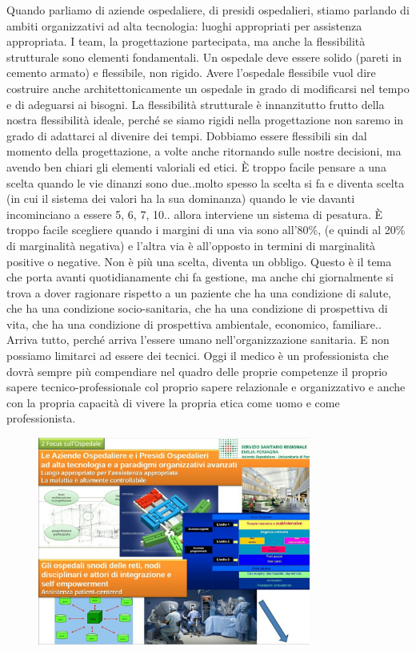 Quando parliamo di aziende ospedaliere, di presidi ospedalieri, stiamo
parlando di ambiti organizzativi ad alta tecnologia: luoghi appropriati
per assistenza appropriata. I team, la progettazione partecipata, ma
anche la flessibilità strutturale sono elementi fondamentali. Un
ospedale deve essere solido (pareti in cemento armato) e flessibile, non
rigido. Avere l'ospedale flessibile vuol dire costruire anche
architettonicamente un ospedale in grado di modificarsi nel tempo e di
adeguarsi ai bisogni. La flessibilità strutturale è innanzitutto frutto
della nostra flessibilità ideale, perché se siamo rigidi nella
progettazione non saremo in grado di adattarci al divenire dei tempi.
Dobbiamo essere flessibili sin dal momento della progettazione, a volte
anche ritornando sulle nostre decisioni, ma avendo ben chiari gli
elementi valoriali ed etici. È troppo facile pensare a una scelta quando
le vie dinanzi sono due..molto spesso la scelta si fa e diventa scelta
(in cui il sistema dei valori ha la sua dominanza) quando le vie davanti
incominciano a essere 5, 6, 7, 10.. allora interviene un sistema di
pesatura. È troppo facile scegliere quando i margini di una via sono
all'80\%, (e quindi al 20\% di marginalità negativa) e l'altra via è
all'opposto in termini di marginalità positive o negative. Non è più una
scelta, diventa un obbligo. Questo è il tema che porta avanti
quotidianamente chi fa gestione, ma anche chi giornalmente si trova a
dover ragionare rispetto a un paziente che ha una condizione di salute,
che ha una condizione socio-sanitaria, che ha una condizione di
prospettiva di vita, che ha una condizione di prospettiva ambientale,
economico, familiare.. Arriva tutto, perché arriva l'essere umano
nell'organizzazione sanitaria. E non possiamo limitarci ad essere dei
tecnici. Oggi il medico è un professionista che dovrà sempre più
compendiare nel quadro delle proprie competenze il proprio sapere
tecnico-professionale col proprio sapere relazionale e organizzativo e
anche con la propria capacità di vivere la propria etica come uomo e
come professionista.

 \begin{figure}[!ht]
\centering
	\includegraphics[width=0.8\textwidth]{32/image10.jpeg}
	\end{figure}

